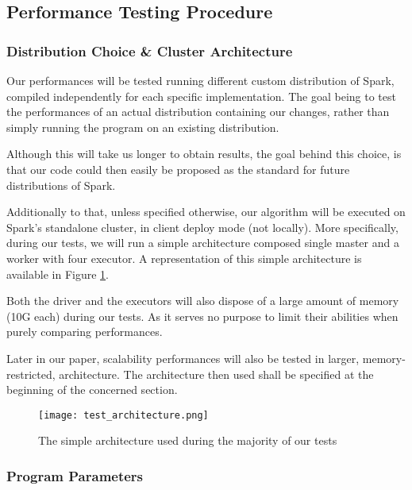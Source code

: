 \documentclass{eplmastersthesis}
\begin{document}
\subsection{Performance Testing Procedure}
\subsubsection{Distribution Choice \& Cluster Architecture}

Our performances will be tested running different custom distribution of Spark, compiled independently for each specific implementation. The goal being to test the performances of an actual distribution containing our changes, rather than simply running the program on an existing distribution. \newline

Although this will take us longer to obtain results, the goal behind this choice, is that our code could then easily be proposed as the standard for future distributions of Spark.  \newline

Additionally to that, unless specified otherwise, our algorithm will be executed on Spark's standalone cluster, in client deploy mode (not locally). More specifically, during our tests, we will run a simple architecture composed single master and a worker with four executor. A representation of this simple architecture is available in Figure \ref{fig:test_architecture}.\newline

Both the driver and the executors will also dispose of a large amount of memory (10G each) during our tests. As it serves no purpose to limit their abilities when purely comparing performances. \newline

Later in our paper, scalability performances will also be tested in larger, memory-restricted, architecture. The architecture then used shall be specified at the beginning of the concerned section.

\begin{figure}[h]
  \centering
  \texttt{[image: test\_architecture.png]}
  \caption{The simple architecture used during the majority of our tests}
  \label{fig:test_architecture}
\end{figure}

\subsubsection{Program Parameters}
\end{document}
